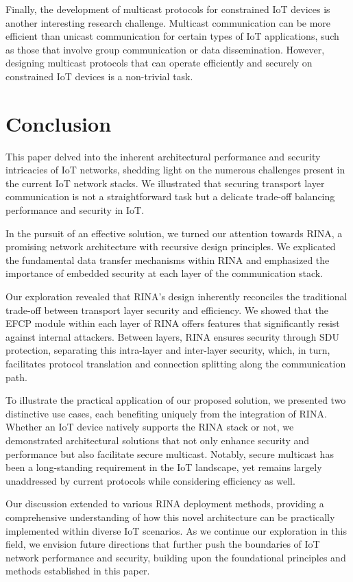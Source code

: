 \documentclass{ieeeaccess}
\begin{document}
Finally, the development of multicast protocols for constrained IoT devices is another interesting research challenge. Multicast communication can be more efficient than unicast communication for certain types of IoT applications, such as those that involve group communication or data dissemination. However, designing multicast protocols that can operate efficiently and securely on constrained IoT devices is a non-trivial task.

\section{Conclusion}
\label{sec:conclusion}

This paper delved into the inherent architectural performance and security intricacies of IoT networks, shedding light on the numerous challenges present in the current IoT network stacks. We illustrated that securing transport layer communication is not a straightforward task but a delicate trade-off balancing performance and security in IoT.

In the pursuit of an effective solution, we turned our attention towards RINA, a promising network architecture with recursive design principles. We explicated the fundamental data transfer mechanisms within RINA and emphasized the importance of embedded security at each layer of the communication stack.

Our exploration revealed that RINA's design inherently reconciles the traditional trade-off between transport layer security and efficiency. We showed that the EFCP module within each layer of RINA offers features that significantly resist against internal attackers. Between layers, RINA ensures security through SDU protection, separating this intra-layer and inter-layer security, which, in turn, facilitates protocol translation and connection splitting along the communication path.

To illustrate the practical application of our proposed solution, we presented two distinctive use cases, each benefiting uniquely from the integration of RINA. Whether an IoT device natively supports the RINA stack or not, we demonstrated architectural solutions that not only enhance security and performance but also facilitate secure multicast. Notably, secure multicast has been a long-standing requirement in the IoT landscape, yet remains largely unaddressed by current protocols while considering efficiency as well.

Our discussion extended to various RINA deployment methods, providing a comprehensive understanding of how this novel architecture can be practically implemented within diverse IoT scenarios. As we continue our exploration in this field, we envision future directions that further push the boundaries of IoT network performance and security, building upon the foundational principles and methods established in this paper.
\end{document}
